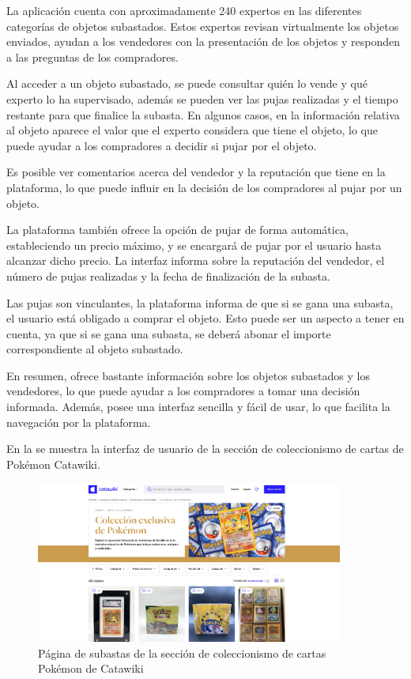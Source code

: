 La aplicación cuenta con aproximadamente 240 expertos en las diferentes categorías de objetos subastados. 
Estos expertos revisan virtualmente los objetos enviados, ayudan a los vendedores con la presentación de los objetos y responden a las preguntas de los compradores.

Al acceder a un objeto subastado, se puede consultar quién lo vende y qué experto lo ha supervisado, además se pueden ver las pujas realizadas y el tiempo restante para que finalice la subasta. 
En algunos casos, en la información relativa al objeto aparece el valor que el experto considera que tiene el objeto, lo que puede ayudar a los compradores a decidir si pujar por el objeto.

Es posible ver comentarios acerca del vendedor y la reputación que tiene en la plataforma, lo que puede influir en la decisión de los compradores al pujar por un objeto.

La plataforma también ofrece la opción de pujar de forma automática, estableciendo un precio máximo, y se encargará de pujar por el usuario hasta alcanzar dicho precio. 
La interfaz informa sobre la reputación del vendedor, el número de pujas realizadas y la fecha de finalización de la subasta.

Las pujas son vinculantes, la plataforma informa de que si se gana una subasta, el usuario está obligado a comprar el objeto. Esto puede ser un aspecto a tener en cuenta, ya que si se gana una subasta,
se deberá abonar el importe correspondiente al objeto subastado.

En resumen, ofrece bastante información sobre los objetos subastados y los vendedores, lo que puede ayudar a los compradores a tomar una decisión informada. Además, posee una interfaz sencilla y fácil de usar, lo que facilita la navegación por la plataforma.


En la  se muestra la interfaz de usuario de la sección de coleccionismo de cartas de Pokémon Catawiki.

\begin{figure}[H]
    \centering
    \includegraphics[width=0.9\textwidth]{figures/4-Estudio-viabilidad/4_Catawiki.png}
    \caption{Página de subastas de la sección de coleccionismo de cartas Pokémon de Catawiki}
    \label{fig:catawiki}
    \hypertarget{fig:catawiki}{}
\end{figure}

